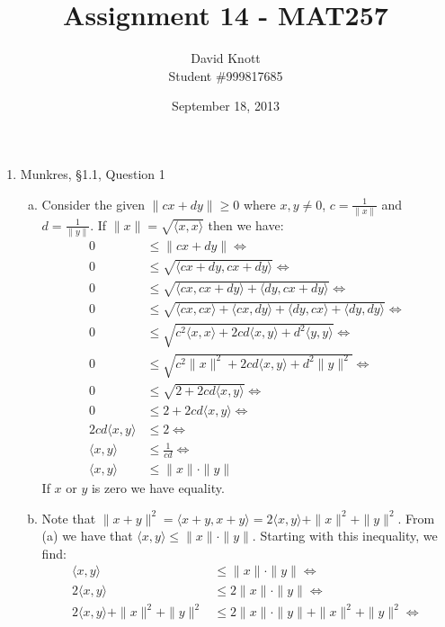 \documentclass[letterpaper,10pt]{article}
\begin{document}
\title{Assignment 14 - MAT257}
\author{David Knott \\  Student \#999817685}
\date{September 18, 2013}
\maketitle
\begin{enumerate}
	\item Munkres, \S1.1, Question 1
	\begin{enumerate}[a)]
		\item Consider the given $\|cx + dy\| \geq 0$ where $x, y \neq 0$, $c = \frac{1}{\|x\|}$ and $d = \frac{1}{\|y\|}$. If $\|x\| = \sqrt{\langle x, x \rangle}$ then we have:
		\begin{align*}
			0 & \leq \|cx + dy\| \iff \\
			0 & \leq \sqrt{\langle cx + dy, cx + dy \rangle} \iff \\
			0 & \leq \sqrt{\langle cx, cx + dy \rangle + \langle dy, cx + dy \rangle} \iff \\
			0 & \leq \sqrt{\langle cx, cx \rangle + \langle cx, dy \rangle + \langle dy, cx \rangle + \langle dy, dy \rangle} \iff \\
			0 & \leq \sqrt{c^2 \langle x, x \rangle + 2cd\langle x, y \rangle + d^2 \langle y, y \rangle}  \iff \\
			0 & \leq \sqrt{c^2 \|x\|^2 + 2cd\langle x, y \rangle + d^2 \|y\|^2 }  \iff \\
			0 & \leq \sqrt{2 + 2cd\langle x, y \rangle }  \iff \\
			0 & \leq 2 + 2cd\langle x, y \rangle   \iff \\
			2cd\langle x, y \rangle & \leq 2   \iff \\
			\langle x, y \rangle & \leq \frac{1}{cd}   \iff \\
			\langle x, y \rangle & \leq \|x\|\cdot\| y \| 
		\end{align*}
		If $x$ or $y$ is zero we have equality.
		\item Note that $\|x + y\|^2 = \langle x+y, x+y\rangle = 2\langle x, y\rangle + \|x\|^2 + \|y\|^2$. From (a) we have that $\langle x, y \rangle \leq \|x\|\cdot\| y \|$. Starting with this inequality, we find:
		\begin{align*}
			\langle x, y \rangle & \leq \|x\|\cdot\| y \| \iff \\
			2 \langle x, y \rangle & \leq 2 \|x\|\cdot\| y \| \iff \\
			2 \langle x, y \rangle + \|x\|^2 + \|y\|^2 & \leq 2 \|x\|\cdot\| y \| + \|x\|^2 + \|y\|^2 \iff \\

\end{align*}
\end{enumerate}
\end{enumerate}
\end{document}
